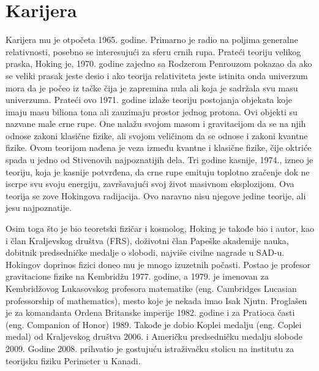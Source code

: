 \documentclass[a4paper, 12pt]{article}
\begin{document}
{\section{Karijera}
Karijera mu je otpočeta 1965. godine. Primarno je radio na poljima generalne 
relativnosti, posebno se interesujući za sferu crnih rupa. Prateći teoriju velikog 
praska, Hoking je, 1970. godine zajedno sa Rodzerom Penrouzom pokazao da ako se veliki 
prasak jeste desio i ako teorija relativiteta jeste istinita onda univerzum mora da je 
počeo iz tačke čija je zapremina nula ali koja je sadržala svu masu univerzuma. \cite{famousscientists}
Prateći ovo 1971. godine izlaže teoriju postojanja objekata koje imaju masu biliona 
tona ali zauzimaju prostor jednog protona. Ovi objekti su nazvane male crne rupe. 
One nalažu svojom masom i gravitacijom da se na njih odnose zakoni klasične fizike, 
ali svojom veličinom da se odnose i zakoni kvantne fizike. Ovom teorijom nađena je 
veza između kvantne i klasične fizike, čije oktriće spada u jedno od Stivenovih 
najpoznatijih dela. Tri godine kasnije, 1974., izneo je teoriju, koja je kasnije 
potvrđena, da crne rupe emituju toplotno zračenje dok ne iscrpe svu svoju energiju, 
završavajući svoj život masivnom eksplozijom. Ova teorija se zove Hokingova radijacija. 
Ovo naravno nisu njegove jedine teorije, ali jesu najpoznatije. \midskip \cite{britishphysicists}

Osim toga što je bio teoretski fizičar i kosmolog, Hoking je takođe bio i autor, 
kao i član Kraljevskog društva (FRS), doživotni član Papeške akademije nauka, dobitnik 
predsedničke medalje o slobodi, najviše civilne nagrade u SAD-u. Hokingov doprinos 
fizici doneo mu je mnogo izuzetnih počasti. Postao je profesor gravitacione fizike na 
Kembridžu 1977. godine, a 1979. je imenovan za Kembridžovog Lukasovskog profesora 
matematike (eng. Cambridges Lucasian professorship of mathematics), mesto koje je 
nekada imao Isak Njutn. Proglašen je za komandanta Ordena Britanske imperije 1982. 
godine i za Pratioca časti (eng. Companion of Honor) 1989. Takođe je dobio Koplei 
medalju (eng. Coplei medal) od Kraljevskog društva 2006. i Američku predsedničku 
medalju slobode 2009. Godine 2008. prihvatio je gostujuću istraživačku stolicu na 
institutu za teorijsku fiziku Perimeter u Kanadi. \cite{britishphysicists}

}
\end{document}
